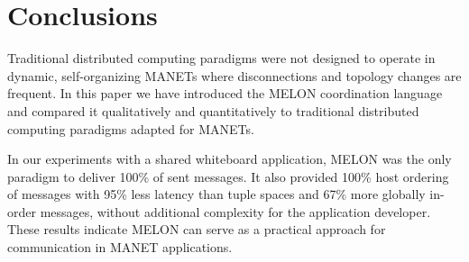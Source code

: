 \documentclass{llncs}
\begin{document}
\section{Conclusions}\label{sec:conclusions}

Traditional distributed computing paradigms were not designed to operate in dynamic, self-organizing MANETs where disconnections and topology changes are frequent. In this paper we have introduced the MELON coordination language and compared it qualitatively and quantitatively to traditional distributed computing paradigms adapted for MANETs.

In our experiments with a shared whiteboard application, MELON was the only paradigm to deliver 100\% of sent messages. It also provided 100\% host ordering of messages with 95\% less latency than tuple spaces and 67\% more globally in-order messages, without additional complexity for the application developer. These results indicate MELON can serve as a practical approach for communication in MANET applications.



\end{document}
